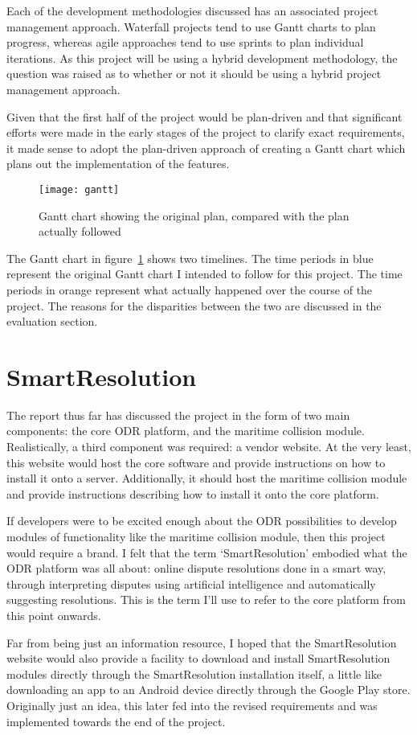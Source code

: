 Each of the development methodologies discussed has an associated project management approach. Waterfall projects tend to use Gantt charts to plan progress, whereas agile approaches tend to use sprints to plan individual iterations. As this project will be using a hybrid development methodology, the question was raised as to whether or not it should be using a hybrid project management approach.

Given that the first half of the project would be plan-driven and that significant efforts were made in the early stages of the project to clarify exact requirements, it made sense to adopt the plan-driven approach of creating a Gantt chart which plans out the implementation of the features.

\begin{figure}[h!]
  \centering
    \ifimages
    \texttt{[image: gantt]}
    \fi
  \caption{Gantt chart showing the original plan, compared with the plan actually followed}
  \label{uml:gantt}
\end{figure}

The Gantt chart in figure~\ref{uml:gantt} shows two timelines. The time periods in blue represent the original Gantt chart I intended to follow for this project. The time periods in orange represent what actually happened over the course of the project. The reasons for the disparities between the two are discussed in the evaluation section.

\section{SmartResolution}

The report thus far has discussed the project in the form of two main components: the core ODR platform, and the maritime collision module. Realistically, a third component was required: a vendor website. At the very least, this website would host the core software and provide instructions on how to install it onto a server. Additionally, it should host the maritime collision module and provide instructions describing how to install it onto the core platform.

If developers were to be excited enough about the ODR possibilities to develop modules of functionality like the maritime collision module, then this project would require a brand. I felt that the term `SmartResolution' embodied what the ODR platform was all about: online dispute resolutions done in a smart way, through interpreting disputes using artificial intelligence and automatically suggesting resolutions. This is the term I'll use to refer to the core platform from this point onwards.

Far from being just an information resource, I hoped that the SmartResolution website would also provide a facility to download and install SmartResolution modules directly through the SmartResolution installation itself, a little like downloading an app to an Android device directly through the Google Play store. Originally just an idea, this later fed into the revised requirements and was implemented towards the end of the project.